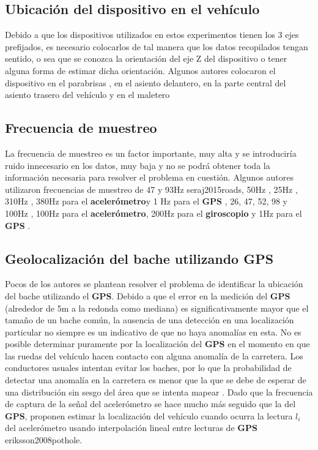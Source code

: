 	\subsection{Ubicación del dispositivo en el vehículo}
		Debido a que los dispositivos utilizados en estos experimentos tienen los 3 ejes prefijados, es necesario colocarlos de tal manera que los
		datos recopilados tengan sentido, o sea que se conozca la orientación del eje Z del dispositivo o tener alguna forma de estimar dicha orientación.
		Algunos autores colocaron el dispositivo en el parabrisas , en el asiento delantero, en la parte
		central del asiento trasero del vehículo y en el maletero 
		
	\subsection{Frecuencia de muestreo}
		La frecuencia de muestreo es un factor importante, muy alta y se introduciría ruido innecesario en los datos, muy baja y no se podrá obtener
		toda la información necesaria para resolver el problema en cuestión. Algunos autores utilizaron frecuencias de muestreo de 47 y 93Hz \brackcite
		{seraj2015roads}, 50Hz , 25Hz , 310Hz , 380Hz para el 
		\textbf{acelerómetro}y 1 Hz para el \textbf{GPS} , 26, 47, 52, 98 y 100Hz , 100Hz para el 
		\textbf{acelerómetro}, 200Hz para el \textbf{giroscopio} y 1Hz para el \textbf{GPS} .

	\subsection{Geolocalización del bache utilizando GPS}
		Pocos de los autores se plantean resolver el problema de identificar la ubicación del bache utilizando el \textbf{GPS}. Debido a que el
		error en la medición del \textbf{GPS} (alrededor de 5m a la redonda como mediana) es significativamente mayor que el tamaño de un bache
		común, la ausencia de una detección en una localización particular no siempre es un indicativo de que no haya anomalías en esta. No es
		posible determinar puramente por la localización del \textbf{GPS} en el momento en que las ruedas del vehículo hacen contacto con alguna
		anomalía de la carretera. Los conductores usuales intentan evitar los baches, por lo que la probabilidad de detectar una anomalía en la
		carretera es menor que la que se debe de esperar de una distribución sin sesgo del área que se intenta mapear .
		Dado que la frecuencia de captura de la señal del acelerómetro se hace mucho más seguido que la del \textbf{GPS}, proponen estimar la localización
		del vehículo cuando ocurra la lectura $l_i$ del acelerómetro usando interpolación lineal entre lecturas de \textbf{GPS} \brackcite
		{eriksson2008pothole}.

